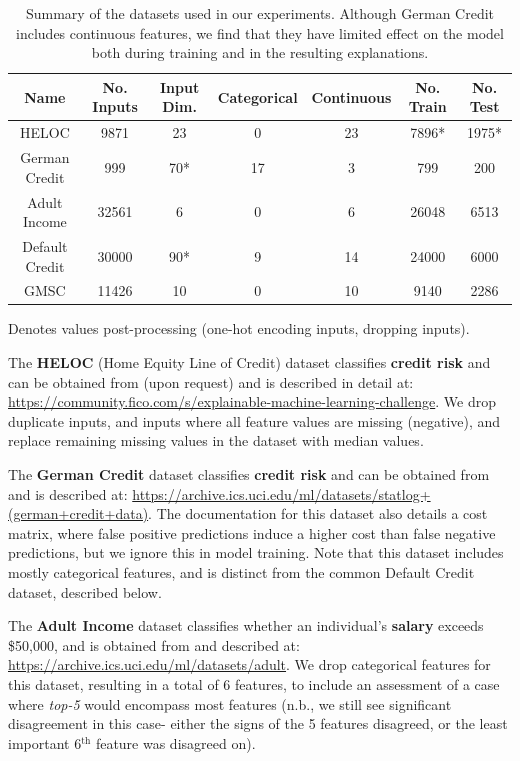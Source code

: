 \begin{table}[b]
\caption{\small Summary of the datasets used in our experiments. Although German Credit includes continuous features, we find that they have limited effect on the model both during training and in the resulting explanations.}
\label{tab:appdatasets}
\centering
\begin{tabular}{ccccccc}
\toprule
Name & No. Inputs & Input Dim. & Categorical & Continuous & No. Train & No. Test\\
\toprule
\midrule
HELOC & 9871 & 23 & 0 & 23 & 7896* & 1975*\\
\midrule
German Credit & 999 & 70* & 17 & 3 & 799 & 200\\
\midrule
Adult Income & 32561 & 6 & 0 & 6 & 26048 & 6513\\
\midrule
Default Credit & 30000 & 90* & 9 & 14 & 24000 & 6000\\
\midrule
GMSC & 11426 & 10 & 0 & 10 & 9140 & 2286\\
\toprule
\end{tabular}
\small *Denotes values post-processing (one-hot encoding inputs, dropping inputs).
\end{table}

The \textbf{HELOC} (Home Equity Line of Credit) dataset \citep{heloc} classifies \textbf{credit risk} and can be obtained from (upon request) and is described in detail at: {\footnotesize\url{https://community.fico.com/s/explainable-machine-learning-challenge}}. We drop duplicate inputs, and inputs where all feature values are missing (negative), and replace remaining missing values in the dataset with median values.

The \textbf{German Credit} dataset \citep{uci2017} classifies \textbf{credit risk} and can be obtained from and is described at: {\footnotesize\url{https://archive.ics.uci.edu/ml/datasets/statlog+(german+credit+data)}}. The documentation for this dataset also details a cost matrix, where false positive predictions induce a higher cost than false negative predictions, but we ignore this in model training. Note that this dataset includes mostly categorical features, and is distinct from the common Default Credit dataset, described below.

The \textbf{Adult Income} dataset \citep{uci2017} classifies whether an individual's \textbf{salary} exceeds \$50,000, and is obtained from and described at: {\footnotesize\url{https://archive.ics.uci.edu/ml/datasets/adult}}. We drop categorical features for this dataset, resulting in a total of 6 features, to include an assessment of a case where \textit{top-5} would encompass most features (n.b., we still see significant disagreement in this case- either the signs of the 5 features disagreed, or the least important 6$^\text{th}$ feature was disagreed on).


